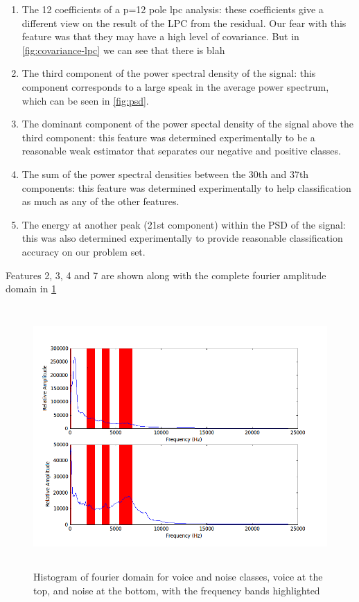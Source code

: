 \documentclass[ %
                    author={Sam Phippen},
                supervisor={Dr. Rafal Bogacz},
                     title={Real time voice activity detectors in noisy personal computing environments},
                  subtitle={},
                    degree={MEng},
                      year={2012} ]{thesis}
\begin{document}
\begin{enumerate}
    \item The 12 coefficients of a p=12 pole lpc analysis: these coefficients
        give a different view on the result of the LPC from the residual. Our
        fear with this feature was that they may have a high level of
        covariance. But in \ref{fig:covariance-lpc} we can see that there is
        blah

    \item The third component of the power spectral density of the signal: this
        component corresponds to a large speak in the average power spectrum,
        which can be seen in \ref{fig:psd}.

    \item The dominant component of the power spectal density of the signal
        above the third component: this feature was determined experimentally
        to be a reasonable weak estimator that separates our negative and
        positive classes.

    \item The sum of the power spectral densities between the 30th and 37th components:
        this feature was determined experimentally to help classification as much
        as any of the other features.

    \item The energy at another peak (21st component) within the PSD of the signal:
        this was also determined experimentally to provide reasonable classification
        accuracy on our problem set.

\end{enumerate}

Features 2, 3, 4 and 7 are shown along with the complete fourier amplitude domain
in \ref{fig:frequencies}

\begin{figure}
    \label{fig:frequencies}
    \includegraphics[height=10cm]{frequencies.png}
    \caption{Histogram of fourier domain for voice and noise classes, voice
    at the top, and noise at the bottom, with the frequency bands highlighted}
\end{figure}
\end{document}
